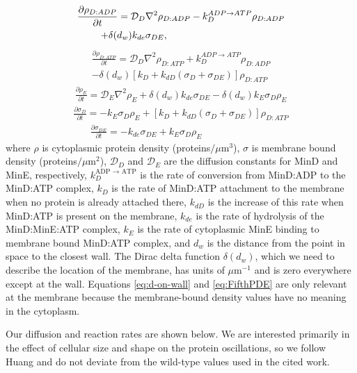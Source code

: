 \documentclass[10pt,letterpaper]{article}
\newcommand\micron{\ensuremath{\mu\text{m}}}
\begin{document}
\begin{multline}
  \frac{\partial \rho_{D:ADP}}{\partial t} = \mathcal{D}_D\nabla^2\rho_{D:ADP}-k_D^{ADP\rightarrow ATP}\rho_{D:ADP}\\
  +\delta(d_w)k_{de}\sigma_{DE},\hspace{3.4cm}
\end{multline}
\begin{multline}
  \frac{\partial \rho_{D:ATP}}{\partial t} = \mathcal{D}_D\nabla^2\rho_{D:ATP}+k_D^{ADP\rightarrow ATP}\rho_{D:ADP}\\
  -\delta(d_w)[k_D+k_{dD}(\sigma_D+\sigma_{DE})]\rho_{D:ATP}
\end{multline}
\begin{multline}
  \frac{\partial \rho_E}{\partial t} = \mathcal{D}_E\nabla^2\rho_E+\delta(d_w)k_{de}\sigma_{DE}
  -\delta(d_w)k_E \sigma_D \rho_E
\end{multline}
\begin{multline}
  \frac{\partial \sigma_D}{\partial t} = -k_E\sigma_D\rho_E
  +[k_D+k_{dD}(\sigma_D+\sigma_{DE})]\rho_{D:ATP}
  \label{eq:d-on-wall}
\end{multline}
\begin{multline}
  \frac{\partial \sigma_{DE}}{\partial t} = -k_{de}\sigma_{DE}+k_E\sigma_D\rho_E\hspace{3cm}
  \label{eq:FifthPDE}
\end{multline}
where $\rho$ is cytoplasmic protein density (proteins$/\micron^{3}$), $\sigma$
is membrane bound density (proteins$/\micron^{2}$), $\mathcal{D}_D$ and
$\mathcal{D}_{E}$ are the diffusion constants for MinD and MinE,
respectively, $k_D^{\textrm{ADP $\rightarrow$ ATP}}$ is the rate of
conversion from MinD:ADP to the MinD:ATP complex, $k_D$ is the rate of
MinD:ATP attachment to the membrane when no protein is already
attached there, $k_{dD}$ is the increase of this rate when MinD:ATP is
present on the membrane, $k_{de}$ is the rate of hydrolysis of the
MinD:MinE:ATP complex, $k_E$ is the rate of cytoplasmic MinE binding
to membrane bound MinD:ATP complex, and $d_w$ is the distance from the
point in space to the closest wall.  The Dirac delta function
$\delta(d_w)$, which we need to describe the location of the membrane,
has units of $\micron^{-1}$ and is zero everywhere except at the wall.
Equations \ref{eq:d-on-wall} and \ref{eq:FifthPDE} are only relevant
at the membrane because the membrane-bound density values have no
meaning in the cytoplasm.

Our diffusion and reaction rates are shown below.  We are interested
primarily in the effect of cellular size and shape on the protein
oscillations, so we follow Huang\cite{huang2003dynamic} and do not
deviate from the wild-type values used in the cited work.
\end{document}
